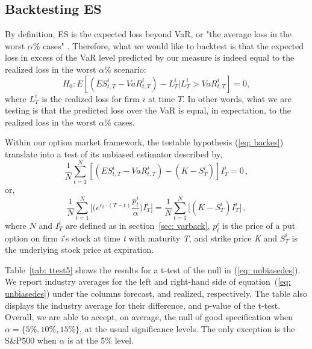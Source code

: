 \documentclass[11pt,a4paper,english]{article}
\begin{document}
\subsection{Backtesting ES}
\label{sec: esback}
By definition, ES is the expected loss beyond VaR, or "the average loss in the worst $\alpha \%$ cases" \citep{Acerbi2002}. Therefore, what we would like to backtest is that the expected loss in excess of the VaR level predicted by our measure is indeed equal to the realized loss in the worst $\alpha\%$ scenario:
\begin{equation}
\label{eq: backes}
H_0: E[(ES^i_{t,T}-VaR^i_{t,T})-L^i_{T}|L^i_{T}>VaR^i_{t,T}]=0,
\end{equation}
where $L^i_{T}$ is the realized loss for firm $i$ at time $T$. In other words, what we are testing is that the predicted loss over the VaR is equal, in expectation, to the realized loss in the worst $\alpha\%$ cases.

Within our option market framework, the testable hypothesis (\ref{eq: backes}) translate into a test of its unbiased estimator described by,
\begin{equation*}
\frac{1}{N}\sum_{t=1}^{N}[(ES^i_{t,T}-VaR^i_{t,T})-(K-S^i_T)]I^i_{T} =0\, ,
\end{equation*}
or,
\begin{equation}
\label{eq: unbiasedes}
\frac{1}{N}\sum_{t=1}^{N}\bigg[\bigg(e^{r_t\cdot (T-t)}\frac{p^i_{t}}{\alpha}\bigg)I^i_{T}\bigg]=\frac{1}{N}\sum_{t=1}^{N}\bigg[(K-S^i_T)I^i_{T}\bigg]\, ,
\end{equation}
where $N$ and $I^i_{T}$ are defined as in section~\ref{sec: varback}, $p^i_{t}$ is the price of a put option on firm \textit{i}'s stock at time \textit{t} with maturity \textit{T}, and strike price \textit{K} and $S^i_T$ is the underlying stock price at expiration.

Table~\ref{tab: ttest5} shows the results for a t-test of the null in (\ref{eq: unbiasedes}). We report industry averages for the left and right-hand side of equation~(\ref{eq: unbiasedes}) under the columns forecast, and realized, respectively. The table also displays the industry average for their difference, and p-value of the t-test. Overall, we are able to accept, on average, the null of good specification when $\alpha=\{5\%,10\%,15\%\}$, at the usual significance levels. The only exception is the S\&P500 when $\alpha$ is at the 5\% level. 

\end{document}

